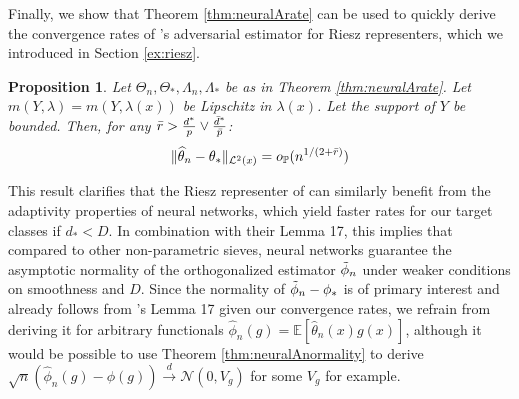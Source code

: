 \documentclass[12pt]{article}
\theoremstyle{myplain}
\newtheorem{proposition}{Proposition}[section]
\theoremstyle{definition}
\theoremstyle{definition}
\theoremstyle{remark}
\numberwithin{equation}{section}
\begin{document}
Finally, we show that Theorem \ref{thm:neuralArate} can be used to quickly derive the convergence rates of \cite{chernozhukov2020adversarial}'s adversarial estimator for Riesz representers, which we introduced in Section \ref{ex:riesz}.
\begin{proposition}\label{thm:rieszrate}
Let $\Theta_n,\Theta_*, \Lambda_n, \Lambda_*$ be as in Theorem \ref{thm:neuralArate}. Let $m(Y,\lambda)=m(Y,\lambda(x))$ be Lipschitz in $\lambda(x)$. Let the support of $Y$ be bounded. Then, for any $\Bar{r}>\frac{d^*}{p}\vee\frac{\Bar{d}^*}{\Bar{p}}$:
$$\|\widehat\theta_n-\theta_*\|_{\mathcal{L}^2(x)}=o_\mathbb{P}(n^{1/(2+\Bar{r})})$$
\end{proposition}
This result clarifies that the Riesz representer of \cite{chernozhukov2020adversarial} can similarly benefit from the adaptivity properties of neural networks, which yield faster rates for our target classes if $d_*<D$. In combination with their Lemma 17, this implies that compared to other non-parametric sieves, neural networks guarantee the asymptotic normality of the orthogonalized estimator $\Tilde\phi_n$ under weaker conditions on smoothness and $D$. Since the normality of $\Tilde\phi_n-\phi_*$ is of primary interest and already follows from \cite{chernozhukov2020adversarial}'s Lemma 17 given our convergence rates, we refrain from deriving it for arbitrary functionals $\widehat\phi_n(g)=\mathbb{E}[\widehat{\theta}_n(x)g(x)]$, although it would be possible to use Theorem \ref{thm:neuralAnormality} to derive $\sqrt{n}(\widehat\phi_n(g)-\phi(g))\overset{d}{\to}\mathcal{N}(0,V_g)$ for some $V_g$ for example.
\end{document}

